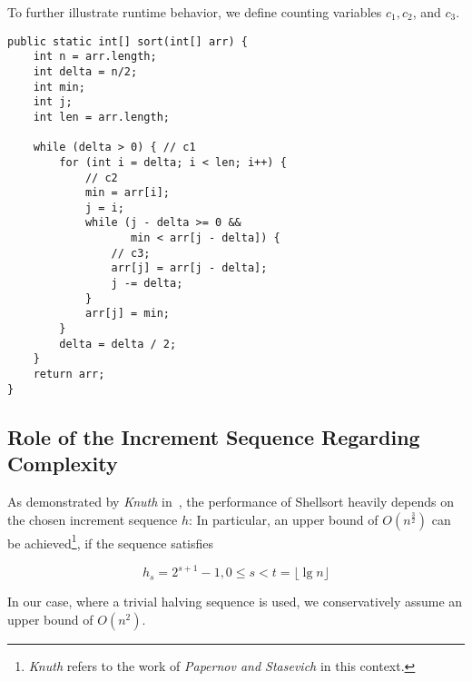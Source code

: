 To further illustrate runtime behavior, we define counting variables $c_1, c_2$, and $c_3$.

\vspace{4mm}
\begin{lstlisting}[style=javastyle, caption={Shellsort implementation using halving sequences. }, label=lst:shell]
public static int[] sort(int[] arr) {
    int n = arr.length;
    int delta = n/2;
    int min;
    int j;
    int len = arr.length;

    while (delta > 0) { // c1
        for (int i = delta; i < len; i++) {
            // c2
            min = arr[i];
            j = i;
            while (j - delta >= 0 &&
                   min < arr[j - delta]) {
                // c3;
                arr[j] = arr[j - delta];
                j -= delta;
            }
            arr[j] = min;
        }
        delta = delta / 2;
    }
    return arr;
}
\end{lstlisting}
\vspace{4mm}


\subsection{Role of the Increment Sequence Regarding Complexity}

As demonstrated by \textit{Knuth} in~\cite[91]{Knu97b}, the performance of Shellsort heavily  depends on the chosen increment sequence $h$: In particular, an upper bound of $O(n^{\frac{3}{2}})$ can be achieved\footnote{
\textit{Knuth} refers to the work of \textit{Papernov and Stasevich} \cite{PS65} in this context.
}, if the sequence satisfies

\[
    h_s = 2^{s+1} - 1, 0 \leq s < t = \lfloor{\lg n} \rfloor
\]

\noindent
In our case, where a trivial halving sequence is used, we conservatively assume an upper bound of $O(n^2)$.
